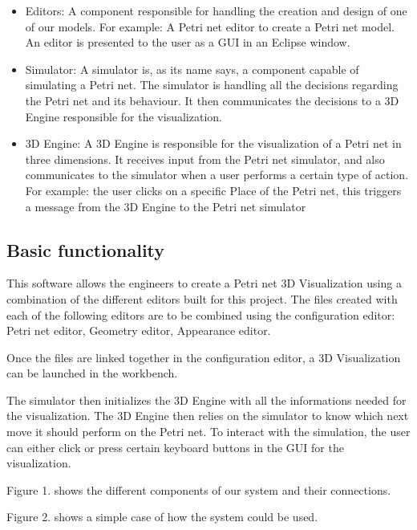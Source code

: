 \begin{itemize}
  \item Editors: A component responsible for handling the creation and design of one of our models. \newline
	For example: A Petri net editor to create a Petri net model. \newline
	An editor is presented to the user as a GUI in an Eclipse window.
  \item Simulator: A simulator is, as its name says, a component capable of simulating a Petri net.
	The simulator is handling all the decisions regarding the Petri net and its behaviour. 
	It then communicates the decisions to a 3D Engine responsible for the visualization.
  \item 3D Engine: A 3D Engine is responsible for the visualization of a Petri net in three dimensions.
	It receives input from the Petri net simulator, and also communicates to the simulator when a user performs a certain type of action. \newline
	For example: the user clicks on a specific Place of the Petri net, this triggers a message from the 3D Engine to the Petri net simulator 
\end{itemize}

\subsection{Basic functionality}


This software allows the engineers to create a Petri net 3D Visualization using a combination of the different editors built for this project.
The files created with each of the following editors are to be combined using the configuration editor: \newline
Petri net editor, Geometry editor, Appearance editor. 

Once the files are linked together in the configuration editor, a 3D Visualization can be launched in the workbench. \newline

The simulator then initializes the 3D Engine with all the informations needed for the visualization. The 3D Engine then relies on the simulator to know which next move it should perform on the Petri net. \newline
To interact with the simulation, the user can either click or press certain keyboard buttons in the GUI for the visualization. \newline

Figure 1. shows the different components of our system and their connections.

Figure 2. shows a simple case of how the system could be used.

